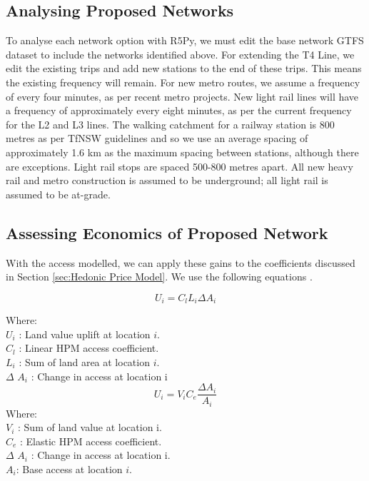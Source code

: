 \documentclass[preprint,12pt,authoryear]{elsarticle}
\begin{document}
\subsection{Analysing Proposed Networks}

To analyse each network option with R5Py, we must edit the base network GTFS dataset to include the networks identified above.  For extending the T4 Line, we edit the existing trips and add new stations to the end of these trips. This means the existing frequency will remain. For new metro routes, we assume a frequency of every four minutes, as per recent metro projects. New light rail lines will have a frequency of approximately every eight minutes, as per the current frequency for the L2 and L3 lines.  The walking catchment for a railway station is 800 metres as per TfNSW guidelines and so we use an average spacing of approximately 1.6 km as the maximum spacing between stations, although there are exceptions. Light rail stops are spaced 500-800 metres apart. All new heavy rail and metro construction is assumed to be underground; all light rail is assumed to be at-grade.  

\subsection{Assessing Economics of Proposed Network}

With the access modelled, we can apply these gains to the coefficients discussed in Section \ref{sec:Hedonic Price Model}.  We use the following equations \parencite{MANN2024}. 


\begin{equation} \label{eq:4}
U_{i} = C_{l}L_{i}\Delta A_{i}
\end{equation}

Where:\\
\(U_{i}\) : Land value uplift at location \(i\). \\
\(C_{l}\) : Linear HPM access coefficient. \\
\(L_{i}\) : Sum of land area at location \(i\). \\
\(\Delta\) \(A_{i}\) : Change in access at location i\\

\begin{equation} \label{eq:5}
U_{i} = V_{i}C_{e}\frac{\Delta A_{i}}{A_{i}}
\end{equation}
Where:\\
\(V_{i}\) : Sum of land value at location i. \\
\(C_{e}\) : Elastic HPM access coefficient. \\
\(\Delta\) \(A_{i}\) : Change in access at location i.\\
\(A_{ i}\): Base access at location \(i\).
\end{document}
